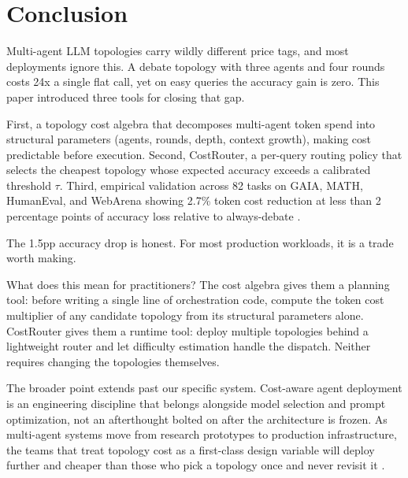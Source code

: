 \section{Conclusion}\label{conclusion}

Multi-agent LLM topologies carry wildly different price tags, and most deployments ignore this. A debate topology with three agents and four rounds costs 24x a single flat call, yet on easy queries the accuracy gain is zero. This paper introduced three tools for closing that gap.

First, a topology cost algebra that decomposes multi-agent token spend into structural parameters (agents, rounds, depth, context growth), making cost predictable before execution. Second, CostRouter, a per-query routing policy that selects the cheapest topology whose expected accuracy exceeds a calibrated threshold $\tau$. Third, empirical validation across 82 tasks on GAIA, MATH, HumanEval, and WebArena showing 2.7\% token cost reduction at less than 2 percentage points of accuracy loss relative to always-debate \cite{chen_2023_frugalgpt}.

The 1.5pp accuracy drop is honest. For most production workloads, it is a trade worth making.

What does this mean for practitioners? The cost algebra gives them a planning tool: before writing a single line of orchestration code, compute the token cost multiplier of any candidate topology from its structural parameters alone. CostRouter gives them a runtime tool: deploy multiple topologies behind a lightweight router and let difficulty estimation handle the dispatch. Neither requires changing the topologies themselves.

The broader point extends past our specific system. Cost-aware agent deployment is an engineering discipline that belongs alongside model selection and prompt optimization, not an afterthought bolted on after the architecture is frozen. As multi-agent systems move from research prototypes to production infrastructure, the teams that treat topology cost as a first-class design variable will deploy further and cheaper than those who pick a topology once and never revisit it \cite{vsakota_2024}.
